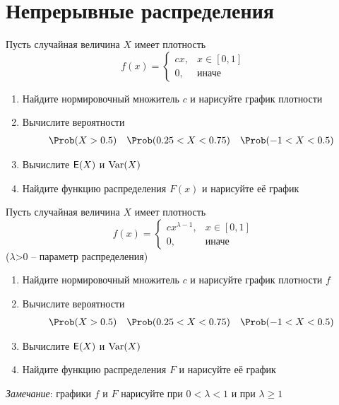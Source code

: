 
\section{Непрерывные распределения}

\begin{exercise}
Пусть случайная величина \(X\) имеет плотность
\[
	f(x)=\begin{cases}
	cx, & x\in[0,1] \\ 0, & \text{иначе}
	\end{cases}
\]
\begin{enumerate}
	\item Найдите нормировочный множитель \(c\) и нарисуйте график плотности
	\item Вычислите вероятности
	\begin{align*}
		\Prob&(X>0.5) & \Prob&(0.25<X<0.75) & \Prob(-1<X<0.5)
	\end{align*}
	\item Вычислите \({\mathsf E}(X)\) и \(\operatorname{Var}(X)\)
	\item Найдите функцию распределения \(F(x)\) и нарисуйте её график
\end{enumerate}
\end{exercise}

\begin{exercise}
Пусть случайная величина \(X\) имеет плотность 
\[
	f(x)=\begin{cases}
	cx^{\lambda-1}, & x\in[0,1] \\ 0, & \text{иначе}
	\end{cases}
\]
(\(\lambda\)>0 -- параметр распределения)
\begin{enumerate}
	\item Найдите нормировочный множитель \(c\) и нарисуйте график плотности \(f\)
	\item Вычислите вероятности
	\begin{align*}
		\Prob&(X>0.5) & \Prob&(0.25<X<0.75) & \Prob(-1<X<0.5)
	\end{align*}
	\item Вычислите \({\mathsf E}(X)\) и \(\operatorname{Var}(X)\)
	\item Найдите функцию распределения \(F\) и нарисуйте её график
\end{enumerate}
\textit{Замечание}: графики \(f\) и  \(F\) нарисуйте при \(0<\lambda<1\) и при \(\lambda\geq 1\)
\end{exercise}

